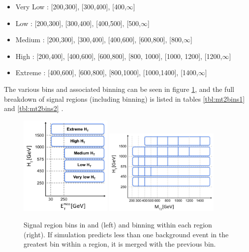 \begin{itemize}
	\item Very Low \HT: [200,300], [300,400], [400,$\infty$]
	\item Low \HT: [200,300], [300,400], [400,500], [500,$\infty$]
	\item Medium \HT: [200,300], [300,400], [400,600], [600,800], [800,$\infty$]
	\item High \HT: [200,400], [400,600], [600,800], [800, 1000], [1000, 1200], [1200,$\infty$]
	\item Extreme \HT: [400,600], [600,800], [800,1000], [1000,1400], [1400,$\infty$]
\end{itemize}
The various \HT bins and associated \mttwo binning can be seen in figure \ref{fig:mt2bins}, and the full breakdown of signal regions (including \mttwo binning) is listed in tables \ref{tbl:mt2bins1} and \ref{tbl:mt2bins2} .
\begin{figure}
	\centering
	\includegraphics[width=0.4\textwidth]{analysis/figs/HTvsMET_2017}
	\includegraphics[width=0.5\textwidth]{analysis/figs/HTvsMT2bins_Moriond2017}
	\renewcommand{\baselinestretch}{1.0}
	\caption[Signal region bins in \HT and \MET (left) and \mttwo binning within each \HT region (right).]{Signal region bins in \HT and \MET (left) and \mttwo binning within each \HT region (right). If simulation predicts less than one background event in the greatest \mttwo bin within a region, it is merged with the previous bin.}
	\label{fig:mt2bins}
\end{figure}
